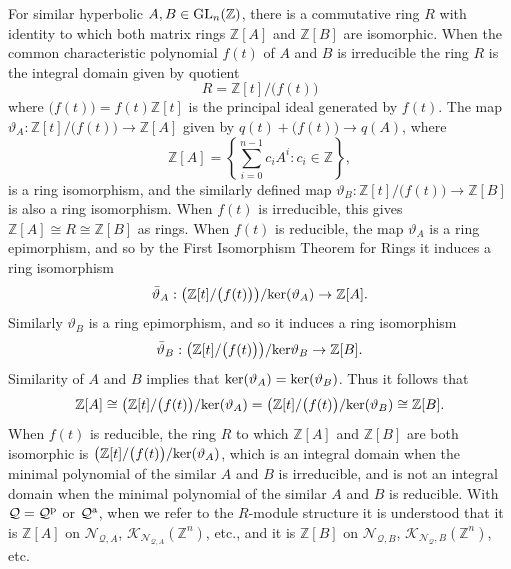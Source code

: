 \documentclass{amsart}
\theoremstyle{plain}
\theoremstyle{definition}
\theoremstyle{remark}
\begin{document}
For similar hyperbolic $A,B \in {\rm GL}_n({\mathbb Z})$, there is a commutative ring $R$ with identity to which both matrix rings ${\mathbb Z}[A]$ and ${\mathbb Z}[B]$ are isomorphic. When the common characteristic polynomial $f(t)$ of $A$ and $B$ is irreducible the ring $R$ is the integral domain given by quotient
\[ R = {\mathbb Z}[t] / \big(f(t)\big)\]
where $\big( f(t) \big) = f(t){\mathbb Z}[t]$ is the principal ideal generated by $f(t)$. The map $\vartheta_A: {\mathbb Z}[t]/\big( f(t)\big) \to {\mathbb Z}[A]$ given by $q(t) + \big(f(t)\big) \to q(A)$, where
\[ {\mathbb Z}[A] = \left\{ \sum_{i=0}^{n-1} c_i A^i : c_i\in {\mathbb Z}\right\},\]
is a ring isomorphism, and the similarly defined map $\vartheta_B:{\mathbb Z}[t]/\big(f(t)\big) \to {\mathbb Z}[B]$ is also a ring isomorphism. When $f(t)$ is irreducible, this gives ${\mathbb Z}[A] \cong R \cong {\mathbb Z}[B]$ as rings. When $f(t)$ is reducible, the map $\vartheta_A$ is a ring epimorphism, and so by the First Isomorphism Theorem for Rings it induces a ring isomorphism
\[ \bar{\vartheta}_A: \big({\mathbb Z}[t]/\big( f(t)\big)\big) / {\rm ker}(\vartheta_A) \to {\mathbb Z}[A].\]
Similarly $\vartheta_B$ is a ring epimorphism, and so it induces a ring isomorphism
\[ \bar{\vartheta}_B: \big({\mathbb Z}[t]/\big( f(t)\big)\big) / {\rm ker}\vartheta_B \to {\mathbb Z}[B].\]
Similarity of $A$ and $B$ implies that ${\rm ker}(\vartheta_A) = {\rm ker}(\vartheta_B)$. Thus it follows that
\[ {\mathbb Z}[A] \cong \big( {\mathbb Z}[t]/\big(f(t)\big)/{\rm ker}(\vartheta_A) = \big( {\mathbb Z}[t]/\big(f(t)\big)/{\rm ker}(\vartheta_B) \cong {\mathbb Z}[B].\]
When $f(t)$ is reducible, the ring $R$ to which ${\mathbb Z}[A]$ and ${\mathbb Z}[B]$ are both isomorphic is $\big( {\mathbb Z}[t]/\big(f(t)\big)/{\rm ker}(\vartheta_A)$, which is an integral domain when the minimal polynomial of the similar $A$ and $B$ is irreducible, and is not an integral domain when the minimal polynomial of the similar $A$ and $B$ is reducible. With ${\mathcal Q} = {\mathcal Q}^{\rm p}$ or ${\mathcal Q}^{\rm a}$, when we refer to the $R$-module structure it is understood that it is ${\mathbb Z}[A]$ on ${\mathcal N}_{ {\mathcal Q},A}$, ${\mathcal K}_{ {\mathcal N}_{{\mathcal Q}, A}}({\mathbb Z}^n)$, etc., and it is ${\mathbb Z}[B]$ on ${\mathcal N}_{ {\mathcal Q},B}$, ${\mathcal K}_{ {{\mathcal N}_{\mathcal Q},B}}({\mathbb Z}^n)$, etc. 
\end{document}
